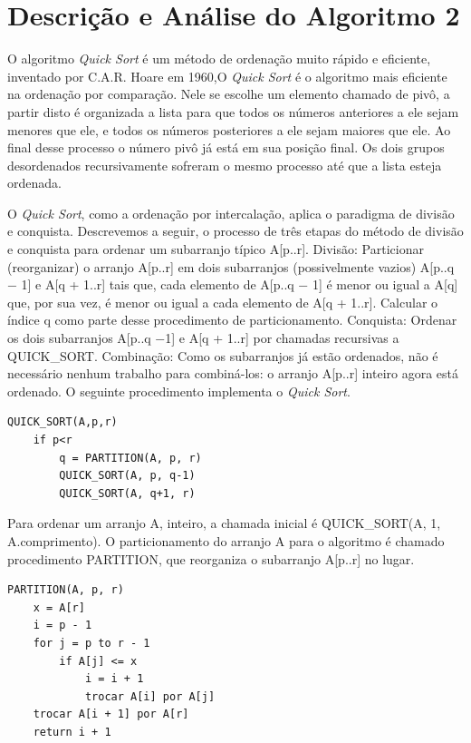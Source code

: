 \documentclass{article}
\renewcommand\texttt[1]{{\ttfamily\color{GruvOrange}#1}}
\begin{document}
\section{Descrição e Análise do Algoritmo 2}

O algoritmo \textit{Quick Sort} é um método de ordenação muito rápido e eficiente, inventado por C.A.R. Hoare em 1960,O \textit{Quick Sort} é o algoritmo mais eficiente na ordenação por comparação. Nele se escolhe um elemento chamado de pivô, a partir disto é organizada a lista para que todos os números anteriores a ele sejam menores que ele, e todos os números posteriores a ele sejam maiores que ele. Ao final desse processo o número pivô já está em sua posição final. Os dois grupos desordenados recursivamente sofreram o mesmo processo até que a lista esteja ordenada.

O \textit{Quick Sort}, como a ordenação por intercalação, aplica o paradigma de divisão e conquista. Descrevemos a seguir, o processo de três etapas do método de divisão e conquista para ordenar um subarranjo típico \texttt{A[p..r]}. Divisão: Particionar (reorganizar) o arranjo \texttt{A[p..r]} em dois subarranjos (possivelmente vazios) \texttt{A[p..q − 1]} e \texttt{A[q + 1..r]} tais que, cada elemento de \texttt{A[p..q − 1]} é menor ou igual a \texttt{A[q]} que, por sua vez, é menor ou igual a cada elemento de \texttt{A[q + 1..r]}. Calcular o índice q como parte desse procedimento de particionamento. Conquista: Ordenar os dois subarranjos \texttt{A[p..q −1]} e \texttt{A[q + 1..r]} por chamadas recursivas a \texttt{QUICK\_SORT}. Combinação: Como os subarranjos já estão ordenados, não é necessário nenhum trabalho para combiná-los: o arranjo \texttt{A[p..r]} inteiro agora está ordenado. O seguinte procedimento implementa o \textit{Quick Sort}.

\begin{verbatim}
QUICK_SORT(A,p,r)
    if p<r
        q = PARTITION(A, p, r)
        QUICK_SORT(A, p, q-1)
        QUICK_SORT(A, q+1, r)
\end{verbatim}

Para ordenar um arranjo \texttt{A}, inteiro, a chamada inicial é \texttt{QUICK\_SORT(A, 1, A.comprimento)}.
O particionamento do arranjo \texttt{A} para o algoritmo é chamado procedimento \texttt{PARTITION}, que reorganiza o subarranjo \texttt{A[p..r]} no \texttt{lugar}.

\begin{verbatim}
PARTITION(A, p, r)
    x = A[r]
    i = p - 1
    for j = p to r - 1
        if A[j] <= x
            i = i + 1
            trocar A[i] por A[j]
    trocar A[i + 1] por A[r]
    return i + 1
\end{verbatim}
\end{document}
